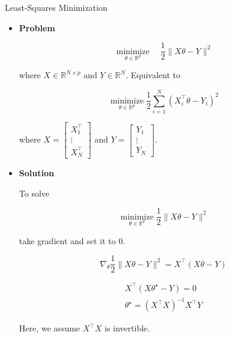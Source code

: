 \begin{frame}[allowframebreaks]

\begin{myexampleblock}{1.5}{Least-Squares Minimization}
    \begin{itemize}
        \item
        \textbf{Problem}

        $$
        \underset{\theta \in \mathbb{R}^{p}}{\operatorname{minimize}} \quad \frac{1}{2}\|X \theta-Y\|^{2}
        $$

        where $X \in \mathbb{R}^{N \times p}$ and $Y \in \mathbb{R}^{N}$. Equivalent to

        $$
        \underset{\theta \in \mathbb{R}^{p}}{\operatorname{minimize}} \frac{1}{2} \sum_{i=1}^{N}\left(X_{i}^{\top} \theta-Y_{i}\right)^{2}
        $$

        where $X=\left[\begin{array}{c}X_{1}^{\top} \\ \vdots \\ X_{N}^{\top}\end{array}\right]$ and $Y=\left[\begin{array}{c}Y_{1} \\ \vdots \\ Y_{N}\end{array}\right]$.
        \item
        \textbf{Solution}

        To solve

        $$
        \underset{\theta \in \mathbb{R}^{p}}{\operatorname{minimize}} \frac{1}{2}\|X \theta-Y\|^{2}
        $$

        take gradient and set it to $0$.

        $$
        \nabla_{\theta} \frac{1}{2}\|X \theta-Y\|^{2}=X^{\top}(X \theta-Y)
        $$

        $$
        \begin{gathered}
        X^{\top}\left(X \theta^{\star}-Y\right)=0 \\
        \theta^{\star}=\left(X^{\top} X\right)^{-1} X^{\top} Y
        \end{gathered}
        $$

        Here, we assume $X^{\top} X$ is invertible.
    \end{itemize}
\end{myexampleblock}

\end{frame}

